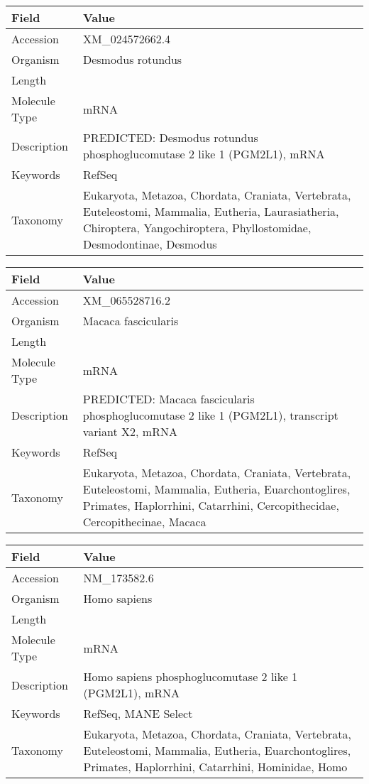 \documentclass[10pt]{article}
\begin{document}
{\footnotesize
\begin{longtable}{>{\raggedright\arraybackslash}p{4.5cm} >{\raggedright\arraybackslash}p{11.5cm}}
\textbf{Field} & \textbf{Value} \\
\hline
Accession & XM\_024572662.4 \\
Organism & Desmodus rotundus \\
Length & 7758 \\
Molecule Type & mRNA \\
Description & PREDICTED: Desmodus rotundus phosphoglucomutase 2 like 1 (PGM2L1), mRNA \\
Keywords & RefSeq \\
Taxonomy & Eukaryota, Metazoa, Chordata, Craniata, Vertebrata, Euteleostomi, Mammalia, Eutheria, Laurasiatheria, Chiroptera, Yangochiroptera, Phyllostomidae, Desmodontinae, Desmodus \\
\end{longtable}
}

{\footnotesize
\begin{longtable}{>{\raggedright\arraybackslash}p{4.5cm} >{\raggedright\arraybackslash}p{11.5cm}}
\textbf{Field} & \textbf{Value} \\
\hline
Accession & XM\_065528716.2 \\
Organism & Macaca fascicularis \\
Length & 3587 \\
Molecule Type & mRNA \\
Description & PREDICTED: Macaca fascicularis phosphoglucomutase 2 like 1 (PGM2L1), transcript variant X2, mRNA \\
Keywords & RefSeq \\
Taxonomy & Eukaryota, Metazoa, Chordata, Craniata, Vertebrata, Euteleostomi, Mammalia, Eutheria, Euarchontoglires, Primates, Haplorrhini, Catarrhini, Cercopithecidae, Cercopithecinae, Macaca \\
\end{longtable}
}

{\footnotesize
\begin{longtable}{>{\raggedright\arraybackslash}p{4.5cm} >{\raggedright\arraybackslash}p{11.5cm}}
\textbf{Field} & \textbf{Value} \\
\hline
Accession & NM\_173582.6 \\
Organism & Homo sapiens \\
Length & 8477 \\
Molecule Type & mRNA \\
Description & Homo sapiens phosphoglucomutase 2 like 1 (PGM2L1), mRNA \\
Keywords & RefSeq, MANE Select \\
Taxonomy & Eukaryota, Metazoa, Chordata, Craniata, Vertebrata, Euteleostomi, Mammalia, Eutheria, Euarchontoglires, Primates, Haplorrhini, Catarrhini, Hominidae, Homo \\
\end{longtable}
}
\end{document}
